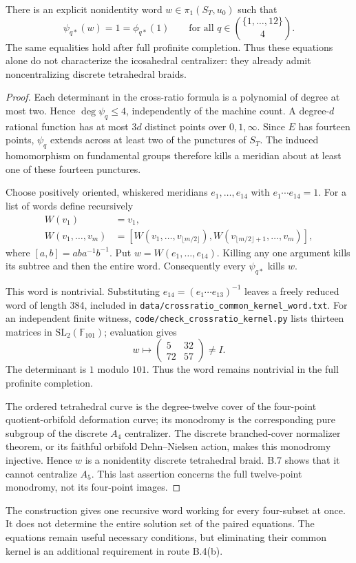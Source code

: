 There is an explicit nonidentity word \(w\in\pi_1(S_T,u_0)\)
such that
\[
  \psi_{q*}(w)=1=\phi_{q*}(1)
       \qquad\text{for all }q\in\binom{\{1,\ldots,12\}}4.
\]
The same equalities hold after full profinite completion.
Thus these equations alone do not characterize the icosahedral
centralizer: they already admit noncentralizing discrete
tetrahedral braids.
\begin{proof}
Each determinant in the cross-ratio formula is a polynomial of
degree at most two. Hence \(\deg\psi_q\leq4\), independently of
the machine count. A degree-\(d\) rational function has at most
\(3d\) distinct points over \(0,1,\infty\).
Since \(E\) has fourteen points, \(\psi_q\) extends across at
least two of the punctures of \(S_T\). The induced homomorphism
on fundamental groups therefore kills a meridian about at least
one of these fourteen punctures.

Choose positively oriented, whiskered meridians
\(e_1,\ldots,e_{14}\) with
\(e_1\cdots e_{14}=1\). For a list of words define recursively
\[
\begin{split}
 W(v_1)&=v_1,\\
 W(v_1,\ldots,v_m)
  &=[W(v_1,\ldots,v_{\lfloor m/2\rfloor}),
     W(v_{\lfloor m/2\rfloor+1},\ldots,v_m)],
\end{split}
\]
where \([a,b]=aba^{-1}b^{-1}\).
Put \(w=W(e_1,\ldots,e_{14})\).
Killing any one argument kills its subtree and then the entire
word. Consequently every \(\psi_{q*}\) kills \(w\).

This word is nontrivial. Substituting
\(e_{14}=(e_1\cdots e_{13})^{-1}\) leaves a freely reduced word
of length 384, included in
\texttt{data/crossratio\_common\_kernel\_word.txt}.
For an independent finite witness,
\texttt{code/check\_crossratio\_kernel.py} lists thirteen
matrices in \(\mathrm{SL}_2(\mathbb F_{101})\); evaluation gives
\[
 w\longmapsto
 \begin{pmatrix}5&32\\72&57\end{pmatrix}\ne I .
\]
The determinant is \(1\) modulo \(101\).
Thus the word remains nontrivial in the full profinite completion.

The ordered tetrahedral curve is the degree-twelve cover of the
four-point quotient-orbifold deformation curve; its monodromy is
the corresponding pure subgroup of the discrete \(A_4\)
centralizer. The discrete branched-cover normalizer theorem,
or its faithful orbifold Dehn--Nielsen action, makes this
monodromy injective. Hence \(w\) is a nonidentity discrete
tetrahedral braid. B.7 shows that it cannot centralize \(A_5\).
This last assertion concerns the full twelve-point monodromy,
not its four-point images.
\end{proof}

The construction gives one recursive word working for every
four-subset at once. It does not determine the entire solution set
of the paired equations. The equations remain useful necessary
conditions, but eliminating their common kernel is an additional
requirement in route B.4(b).
